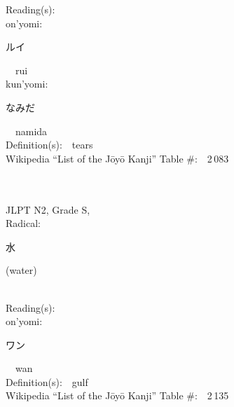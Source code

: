 \begin{multicols}{2}
Reading(s):\ \ \\
{\hspace*{1em}}on'yomi:\ \ \\
{\hspace*{2em}}{\begin{CJK}{UTF8}{min} ルイ \end{CJK}}\ \ rui\ \ \\
{\hspace*{1em}}kun'yomi:\ \ \\
{\hspace*{2em}}{\begin{CJK}{UTF8}{min} なみだ \end{CJK}}\ \ namida\ \ \\
Definition(s):\ \ tears \\
Wikipedia ``List of the J\=oy\=o Kanji'' Table \#:\ \ 2\,083 \\
\ \ \\
{\fontsize{34pt}{40pt}  }\ \ \\  %
{JLPT N2, Grade S, \\Radical:\ \ {\begin{CJK}{UTF8}{min} 水 \end{CJK}} (water) } \\
Reading(s):\ \ \\
{\hspace*{1em}}on'yomi:\ \ \\
{\hspace*{2em}}{\begin{CJK}{UTF8}{min} ワン \end{CJK}}\ \ wan\ \ \\
Definition(s):\ \ gulf \\
Wikipedia ``List of the J\=oy\=o Kanji'' Table \#:\ \ 2\,135 \\
\ \ \\
\end{multicols}



